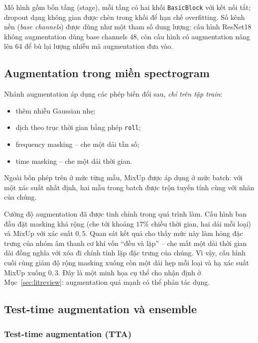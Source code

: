 Mô hình gồm bốn tầng (stage), mỗi tầng có hai khối \texttt{BasicBlock} với kết
nối tắt; dropout dạng không gian được chèn trong khối để hạn chế overfitting. Số
kênh nền (\textit{base channels}) được dùng như một tham số dung lượng: cấu hình
ResNet18 không augmentation dùng base channels 48, còn cấu hình có augmentation
nâng lên 64 để bù lại lượng nhiễu mà augmentation đưa vào.

\subsection{Augmentation trong miền spectrogram}

Nhánh augmentation áp dụng các phép biến đổi sau, \textit{chỉ trên tập train}:

\begin{itemize}[leftmargin=1.4em,itemsep=2pt]
  \item thêm nhiễu Gaussian nhẹ;
  \item dịch theo trục thời gian bằng phép \texttt{roll};
  \item frequency masking -- che một dải tần số;
  \item time masking -- che một dải thời gian.
\end{itemize}

Ngoài bốn phép trên ở mức từng mẫu, MixUp được áp dụng ở mức batch: với một xác
suất nhất định, hai mẫu trong batch được trộn tuyến tính cùng với nhãn của chúng.

Cường độ augmentation đã được tinh chỉnh trong quá trình làm. Cấu hình ban đầu
đặt masking khá rộng (che tới khoảng $17\%$ chiều thời gian, hai dải mỗi loại) và
MixUp với xác suất $0{,}5$. Quan sát kết quả cho thấy mức này làm hỏng đặc trưng
của nhóm âm thanh cơ khí vốn ``đều và lặp'' -- che mất một dải thời gian dài đồng
nghĩa với xóa đi chính tính lặp đặc trưng của chúng. Vì vậy, cấu hình cuối cùng
giảm độ rộng masking xuống còn một dải hẹp mỗi loại và hạ xác suất MixUp xuống
$0{,}3$. Đây là một minh họa cụ thể cho nhận định ở Mục~\ref{sec:litreview}:
augmentation quá mạnh có thể phản tác dụng.

\subsection{Test-time augmentation và ensemble}

\subsubsection{Test-time augmentation (TTA)}

